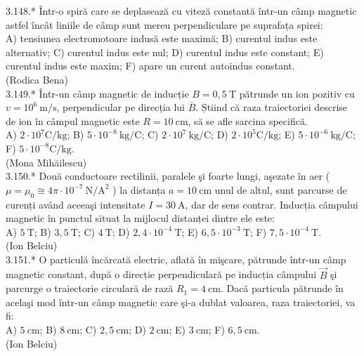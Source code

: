 3.148.* Într-o spiră care se deplasează cu viteză constantă într-un câmp magnetic astfel încât liniile de câmp sunt mereu perpendiculare pe suprafața spirei:\\ A) tensiunea electromotoare indusă este maximă; B) curentul indus este alternativ; C) curentul indus este nul; D) curentul indus este constant; E) curentul indus este maxim; F) apare un curent autoindus constant.\\ (Rodica Bena)\\

3.149.* Într-un câmp magnetic de inducție $B=0,5 \mathrm{~T}$ pătrunde un ion pozitiv cu $v=10^{6} \mathrm{~m} / \mathrm{s}$, perpendicular pe direcția lui $\bar{B}$. Știind că raza traiectoriei descrise de ion în câmpul magnetic este $R=10 \mathrm{~cm}$, să se afle sarcina specifică.\\ A) $2 \cdot 10^{7} \mathrm{C} / \mathrm{kg}$; B) $5 \cdot 10^{-8} \mathrm{~kg} / \mathrm{C}$; C) $2 \cdot 10^{7} \mathrm{~kg} / \mathrm{C}$; D) $2 \cdot 10^{5} \mathrm{C} / \mathrm{kg}$; E) $5 \cdot 10^{-6} \mathrm{~kg} / \mathrm{C}$; F) $5 \cdot 10^{-8} \mathrm{C} / \mathrm{kg}$.\\ (Mona Mihăilescu)\\

3.150.* Două conductoare rectilinii, paralele şi foarte lungi, aşezate în aer ( $\mu=\mu_{0} \cong 4 \pi \cdot 10^{-7} \mathrm{~N} / \mathrm{A}^{2}$ ) la distanța $a=10 \mathrm{~cm}$ unul de altul, sunt parcurse de curenți având aceeaşi intensitate $I=30 \mathrm{~A}$, dar de sens contrar. Inducția câmpului magnetic în punctul situat la mijlocul distanței dintre ele este:\\ A) $5 \mathrm{~T}$; B) $3,5 \mathrm{~T}$; C) $4 \mathrm{~T}$; D) $2,4 \cdot 10^{-4} \mathrm{~T}$; E) $6,5 \cdot 10^{-3} \mathrm{~T}$; F) $7,5 \cdot 10^{-4} \mathrm{~T}$.\\ (Ion Belciu)\\

3.151.* O particulă încărcată electric, aflată în mişcare, pătrunde într-un câmp magnetic constant, după o direcție perpendiculară pe inducția câmpului $\vec{B}$ şi parcurge o traiectorie circulară de rază $R_{1}=4 \mathrm{~cm}$. Dacă particula pătrunde în acelaşi mod într-un câmp magnetic care şi-a dublat valoarea, raza traiectoriei, va fi:\\ A) $5 \mathrm{~cm}$; B)  $8 \mathrm{~cm}$; C) $2,5 \mathrm{~cm}$; D) $2 \mathrm{~cm}$; E) $3 \mathrm{~cm}$; F) $6,5 \mathrm{~cm}$.\\ (Ion Belciu)\\

